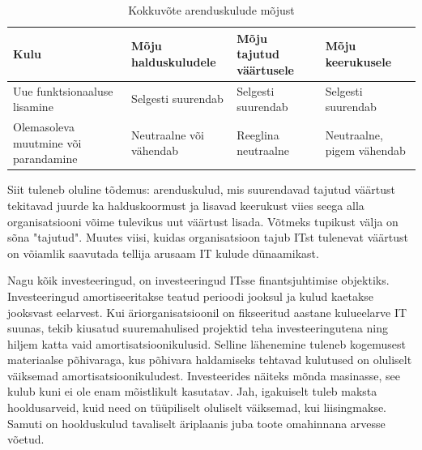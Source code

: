 \documentclass{tufte-book}
\begin{document}
\begin{table}
	\begin{center}
		\begin{tabular}{p{2.8cm}p{1.7cm}p{1.5cm}p{2cm}}
		\toprule
Kulu & Mõju haldus\-kuludele & Mõju tajutud väärtusele & Mõju \mbox{keerukusele} \\
\midrule

Uue funktsionaaluse \mbox{lisamine} & Selgesti \mbox{suurendab} & Selgesti \mbox{suurendab} & Selgesti \mbox{suurendab} \\
\addlinespace
Olemasoleva muutmine või parandamine & Neutraalne või vähendab & Reeglina \mbox{neutraalne} & Neutraalne, \mbox{pigem} vähendab \\

\bottomrule
		\end{tabular}
		\caption{Kokkuvõte arenduskulude mõjust}
		\label{tab:arendus}
	\end{center}
\end{table}

Siit tuleneb oluline tõdemus: arenduskulud, mis suurendavad tajutud väärtust tekitavad juurde ka halduskoormust ja lisavad keerukust viies seega alla organisatsiooni võime tulevikus uut väärtust lisada. Võtmeks tupikust välja on sõna "tajutud". Muutes viisi, kuidas organisatsioon tajub ITst tulenevat väärtust on võiamlik saavutada tellija arusaam IT kulude dünaamikast.

Nagu kõik investeeringud, on investeeringud ITsse finantsjuhtimise objektiks. Investeeringud amortiseeritakse teatud perioodi  jooksul ja kulud kaetakse jooksvast eelarvest. Kui äriorganisatsioonil on fikseeritud aastane kulueelarve IT suunas, tekib kiusatud suuremahulised projektid teha investeeringutena ning hiljem katta vaid amortisatsioonikulusid. Selline lähenemine tuleneb kogemusest materiaalse põhivaraga, kus põhivara haldamiseks tehtavad kulutused on oluliselt väiksemad amortisatsioonikuludest. Investeerides näiteks mõnda masinasse, see kulub kuni ei ole enam mõistlikult kasutatav. Jah, igakuiselt tuleb maksta hooldusarveid, kuid need on tüüpiliselt oluliselt väiksemad, kui liisingmakse. Samuti on hoolduskulud tavaliselt äriplaanis juba toote omahinnana arvesse võetud. 
\end{document}

